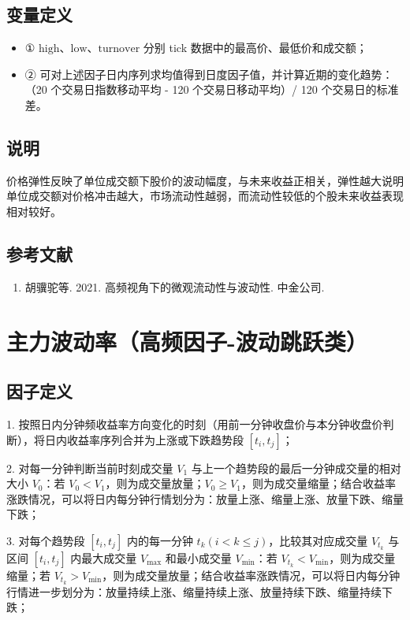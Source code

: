\documentclass{article}
\begin{document}
\subsection{变量定义}
\begin{itemize}
    \item ① \(\mathrm{high}\)、\(\mathrm{low}\)、\(\mathrm{turnover}\) 分别 tick 数据中的最高价、最低价和成交额；
    \item ② 可对上述因子日内序列求均值得到日度因子值，并计算近期的变化趋势：（20 个交易日指数移动平均 - 120 个交易日移动平均）/ 120 个交易日的标准差。
\end{itemize}

\subsection{说明}
价格弹性反映了单位成交额下股价的波动幅度，与未来收益正相关，弹性越大说明单位成交额对价格冲击越大，市场流动性越弱，而流动性较低的个股未来收益表现相对较好。

\subsection{参考文献}
\begin{enumerate}
    \item 胡骥驼等. 2021. 高频视角下的微观流动性与波动性. 中金公司.
\end{enumerate}

\section{主力波动率（高频因子-波动跳跃类）}

\subsection{因子定义}

1. 按照日内分钟频收益率方向变化的时刻（用前一分钟收盘价与本分钟收盘价判断），将日内收益率序列合并为上涨或下跌趋势段 \([t_i, t_j]\)；

2. 对每一分钟判断当前时刻成交量 \(V_1\) 与上一个趋势段的最后一分钟成交量的相对大小 \(V_0\)：若 \(V_0 < V_1\)，则为成交量放量；\(V_0 \geq V_1\)，则为成交量缩量；结合收益率涨跌情况，可以将日内每分钟行情划分为：放量上涨、缩量上涨、放量下跌、缩量下跌；

3. 对每个趋势段 \([t_i, t_j]\) 内的每一分钟 \(t_k (i < k \leq j)\)，比较其对应成交量 \(V_{t_k}\) 与区间 \([t_i, t_j]\) 内最大成交量 \(V_{\max}\) 和最小成交量 \(V_{\min}\)：若 \(V_{t_k} < V_{\min}\)，则为成交量缩量；若 \(V_{t_k} > V_{\min}\)，则为成交量放量；结合收益率涨跌情况，可以将日内每分钟行情进一步划分为：放量持续上涨、缩量持续上涨、放量持续下跌、缩量持续下跌；
\end{document}
